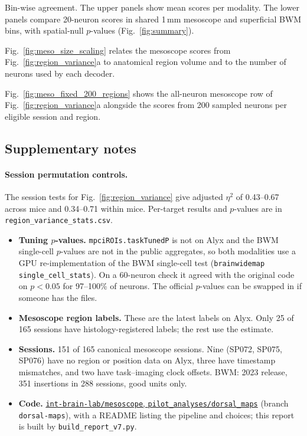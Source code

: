\documentclass[10pt]{article}
\newcommand{\figref}[1]{Fig.~\ref{fig:#1}}
\begin{document}
Bin-wise agreement. The upper panels show mean scores per modality. The lower panels compare 20-neuron scores in shared 1\,mm mesoscope and superficial BWM bins, with spatial-null $p$-values (\figref{summary}).



\figref{meso_size_scaling} relates the mesoscope scores from \figref{region_variance}a to anatomical region volume and to the number of neurons used by each decoder.



\figref{meso_fixed_200_regions} shows the all-neuron mesoscope row of \figref{region_variance}a alongside the scores from 200 sampled neurons per eligible session and region.



\FloatBarrier
\subsection*{Supplementary notes}

\paragraph{Session permutation controls.}
The session tests for \figref{region_variance} give adjusted $\eta^2$ of 0.43--0.67 across mice and 0.34--0.71 within mice. Per-target results and $p$-values are in \texttt{region\_variance\_stats.csv}.
\begin{itemize}
  \item \textbf{Tuning $p$-values.} \texttt{mpciROIs.taskTunedP} is not on Alyx and the BWM single-cell $p$-values are not in the public aggregates, so both modalities use a GPU re-implementation of the BWM single-cell test (\texttt{brainwidemap} \texttt{single\_cell\_stats}). On a 60-neuron check it agreed with the original code on $p < 0.05$ for 97--100\% of neurons. The official $p$-values can be swapped in if someone has the files.
  \item \textbf{Mesoscope region labels.} These are the latest labels on Alyx. Only 25 of 165 sessions have histology-registered labels; the rest use the estimate.
  \item \textbf{Sessions.} 151 of 165 canonical mesoscope sessions. Nine (SP072, SP075, SP076) have no region or position data on Alyx, three have timestamp mismatches, and two have task--imaging clock offsets. BWM: 2023 release, 351 insertions in 288 sessions, good units only.
  \item \textbf{Code.} \href{https://github.com/int-brain-lab/mesoscope/tree/dorsal-maps/pilot_analyses/dorsal_maps}{\texttt{int-brain-lab/mesoscope}, \texttt{pilot\_analyses/dorsal\_maps}} (branch \texttt{dorsal-maps}), with a README listing the pipeline and choices; this report is built by \texttt{build\_report\_v7.py}.
\end{itemize}
\end{document}
